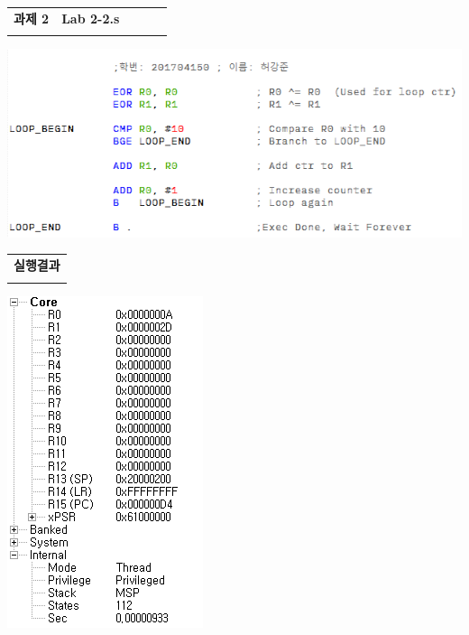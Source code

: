 \documentclass{article}
\begin{document}
\newpage

\begin{table}[htbp]
    \begin{tabularx}{\linewidth}{@{\extracolsep{\fill} }
        >{\centering}p{0.3\linewidth}
        p{0.7\linewidth} }
    \Xhline{3\arrayrulewidth}
    \textbf{과제 2} & \textbf{Lab 2-2.s} \\ \Xhline{3\arrayrulewidth}
    \end{tabularx}
\end{table}

\begin{center}
\includegraphics{result/lab2-2-src.PNG}
\end{center}

\begin{table}[htbp]
    \begin{tabularx}{\textwidth}{@{\extracolsep{\fill} }
        p{\linewidth}}
    \Xhline{3\arrayrulewidth}
    \textbf{실행결과} \\ \Xhline{3\arrayrulewidth}
    \end{tabularx}
\end{table}

\begin{center}
\includegraphics{result/lab2-2-reg.PNG}
\end{center}
\end{document}
